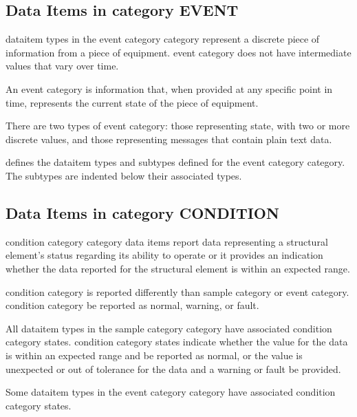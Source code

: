 

\subsection{Data Items in category EVENT}

\gls{dataitem} types in the \gls{event category} category represent a discrete piece of information from a piece of equipment.  \gls{event category} does not have intermediate values that vary over time.

An \gls{event category} is information that, when provided at any specific point in time, represents the current state of the piece of equipment.

There are two types of \gls{event category}: those representing state, with two or more discrete values, and those representing messages that contain plain text data.

 defines the \gls{dataitem} types and subtypes defined for the \gls{event category} category.  The subtypes are indented below their associated types. 



\newpage

\subsection{Data Items in category CONDITION}

\gls{condition category} category data items report data representing a \gls{structural element}’s status regarding its ability to operate or it provides an indication whether the data reported for the \gls{structural element} is within an expected range.

\gls{condition category} is reported differently than \gls{sample category} or \gls{event category}.  \gls{condition category} \must be reported as \gls{normal}, \gls{warning}, or \gls{fault}.

All \gls{dataitem} types in the \gls{sample category} category \may have associated \gls{condition category} states.  \gls{condition category} states indicate whether the value for the data is within an expected range and \must be reported as \gls{normal}, or the value is unexpected or out of tolerance for the data and a \gls{warning} or \gls{fault} \must be provided.

Some \gls{dataitem} types in the \gls{event category} category \may have associated \gls{condition category} states.

